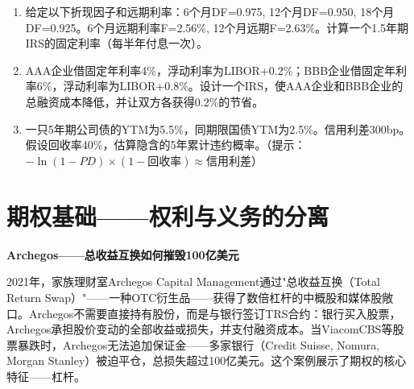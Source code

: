 \documentclass[a4paper,11pt]{ctexbook}
\begin{document}
\begin{exercises}
\begin{enumerate}
  \item 给定以下折现因子和远期利率：6个月DF=0.975, 12个月DF=0.950, 18个月DF=0.925。6个月远期利率F=2.56\%, 12个月远期F=2.63\%。计算一个1.5年期IRS的固定利率（每半年付息一次）。
  \item AAA企业借固定年利率4\%，浮动利率为LIBOR+0.2\%；BBB企业借固定年利率6\%，浮动利率为LIBOR+0.8\%。设计一个IRS，使AAA企业和BBB企业的总融资成本降低，并让双方各获得0.2\%的节省。
  \item 一只5年期公司债的YTM为5.5\%，同期限国债YTM为2.5\%。信用利差300bp。假设回收率40\%，估算隐含的5年累计违约概率。（提示：$-\ln(1 - PD) \times (1 - 回收率) \approx 信用利差$）
\end{enumerate}
\end{exercises}


\newpage
\chapter{期权基础——权利与义务的分离}

\begin{scenario}
\textbf{Archegos——总收益互换如何摧毁100亿美元}

2021年，家族理财室Archegos Capital Management通过"总收益互换（Total Return Swap）"——一种OTC衍生品——获得了数倍杠杆的中概股和媒体股敞口。Archegos不需要直接持有股份，而是与银行签订TRS合约：银行买入股票，Archegos承担股价变动的全部收益或损失，并支付融资成本。当ViacomCBS等股票暴跌时，Archegos无法追加保证金——多家银行（Credit Suisse, Nomura, Morgan Stanley）被迫平仓，总损失超过100亿美元。这个案例展示了期权的核心特征——杠杆。
\end{scenario}
\end{document}
